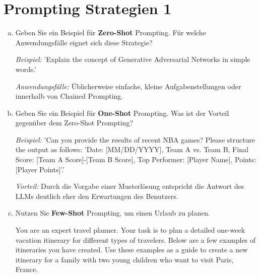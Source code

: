 \documentclass[12pt,ngerman]{AssignmentClass}
\begin{document}
    \section{Prompting Strategien 1}
        \begin{enumerate}[a)]
            \item Geben Sie ein Beispiel für \textbf{Zero-Shot} Prompting. Für welche Anwendungsfälle eignet sich diese Strategie?

            \textit{Beispiel:} 'Explain the concept of Generative Adversarial Networks in simple words.'
            
            \textit{Anwendungsfälle:} Üblicherweise einfache, kleine Aufgabenstellungen oder innerhalb von Chained Prompting.
            
            \item Geben Sie ein Beispiel für \textbf{One-Shot} Prompting. Was ist der Vorteil gegenüber dem Zero-Shot Prompting?

            \textit{Beispiel:} 'Can you provide the results of recent NBA games? Please structure the output as follows: 'Date: [MM/DD/YYYY], Team A vs. Team B, Final Score: [Team A Score]-[Team B Score], Top Performer: [Player Name], Points: [Player Points]'.'

            \textit{Vorteil:} Durch die Vorgabe einer Musterlösung entspricht die Antwort des LLMs deutlich eher den Erwartungen des Benutzers.
             
            \item Nutzen Sie \textbf{Few-Shot} Prompting, um einen Urlaub zu planen.

            You are an expert travel planner. Your task is to plan a detailed one-week vacation itinerary for different types of travelers. Below are a few examples of itineraries you have created. Use these examples as a guide to create a new itinerary for a family with two young children who want to visit Paris, France.\\


\end{enumerate}
\end{document}

